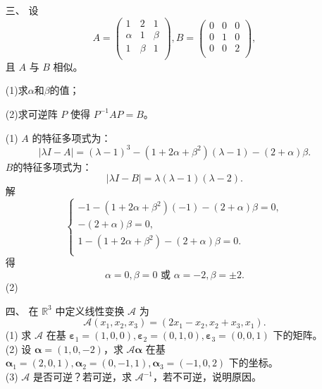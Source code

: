 \begin{enumerate}[1~]
\item[三、]
设
$$
A = \left( \begin{matrix}
1&  2&  1\\
{\alpha}&  1&  {\beta}\\
1&  {\beta}&  1\\
\end{matrix} \right), B = \left( \begin{matrix}
0&  0&  0\\
0&  1&  0\\
0&  0&  2\\
\end{matrix} \right),
$$
且 $A$ 与 $B$ 相似。

(1)求${\alpha}$和${\beta}$的值；

(2)求可逆阵 $P$ 使得 $P^{-1}AP=B$。

\begin{solution}
(1) $A$ 的特征多项式为：\[
|\lambda I-A|=(\lambda-1)^3-(1+2{\alpha}+{\beta}^2)(\lambda-1)-(2+{\alpha}){\beta}.
\]
$B$的特征多项式为：\[
|\lambda I-B|=\lambda(\lambda-1)(\lambda-2).
\]
解\[
\left\{ \begin{array}{l}
	-1-\left( 1+2{\alpha} +{\beta} ^2 \right) \left( -1 \right) -\left( 2+{\alpha} \right) {\beta} =0,\\
	-\left( 2+{\alpha} \right) {\beta} =0,\\
	1-\left( 1+2{\alpha} +{\beta} ^2 \right) -\left( 2+{\alpha} \right) {\beta} =0.\\
\end{array} \right. 
\]
得\[
{\alpha}=0, {\beta}=0 \text{\ 或\ } {\alpha}=-2, {\beta}=\pm 2.
\]
(2) 
\end{solution}

\item[四、]
在 $\mathbb { R } ^ { 3 }$ 中定义线性变换 $\mathscr { A }$ 为\[
\mathscr { A } \left( x _ { 1 } , x _ { 2 } , x _ { 3 } \right) = \left( 2 x _ { 1 } - x _ { 2 } , x _ { 2 } + x _ { 3 } , x _ { 1 } \right).
\]
(1) 求 $\mathscr { A }$ 在基 $\boldsymbol{\varepsilon} _ { 1 } = ( 1,0,0 ) , \boldsymbol{\varepsilon} _ { 2 } = ( 0,1,0 ) , \boldsymbol{\varepsilon} _ { 3 } = ( 0,0,1 )$ 下的矩阵。\\
(2) 设 $\boldsymbol{\alpha} = ( 1,0 , - 2 )$，求 $\mathscr { A } \boldsymbol{\alpha}$ 在基 $\boldsymbol{\alpha} _ { 1 } = ( 2,0,1 ) , \boldsymbol{\alpha} _ { 2 } = ( 0 , - 1,1 ) , \boldsymbol{\alpha} _ { 3 } = ( - 1,0,2 )$ 下的坐标。\\
(3) $\mathscr { A }$ 是否可逆？若可逆，求 $\mathscr{A}^{-1}$，若不可逆，说明原因。


\end{enumerate}
